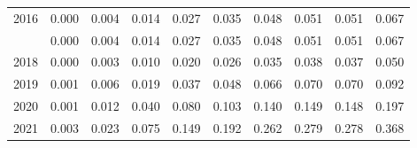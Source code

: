 \documentclass[
]{article}
\begin{document}
\begin{longtable}[t]{lrrrrrrrrr}
2016 & 0.000 & 0.004 & 0.014 & 0.027 & 0.035 & 0.048 & 0.051 & 0.051 & 0.067\\
\addlinespace
2017 & 0.000 & 0.004 & 0.014 & 0.027 & 0.035 & 0.048 & 0.051 & 0.051 & 0.067\\
2018 & 0.000 & 0.003 & 0.010 & 0.020 & 0.026 & 0.035 & 0.038 & 0.037 & 0.050\\
2019 & 0.001 & 0.006 & 0.019 & 0.037 & 0.048 & 0.066 & 0.070 & 0.070 & 0.092\\
2020 & 0.001 & 0.012 & 0.040 & 0.080 & 0.103 & 0.140 & 0.149 & 0.148 & 0.197\\
2021 & 0.003 & 0.023 & 0.075 & 0.149 & 0.192 & 0.262 & 0.279 & 0.278 & 0.368\\*
\end{longtable}
\end{document}
